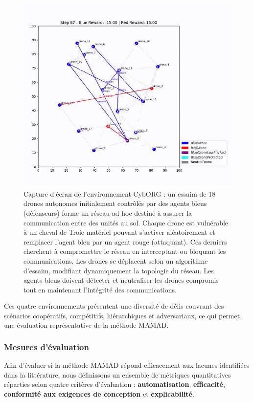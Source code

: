 \begin{figure}[h!]
    \centering
    \includegraphics[width=0.6\linewidth]{figures/cyborg.png}
    \caption{Capture d'écran de l'environnement CybORG : un essaim de 18 drones autonomes initialement contrôlés par des agents bleus (défenseurs) forme un réseau ad hoc destiné à assurer la communication entre des unités au sol. Chaque drone est vulnérable à un cheval de Troie matériel pouvant s'activer aléatoirement et remplacer l'agent bleu par un agent rouge (attaquant). Ces derniers cherchent à compromettre le réseau en interceptant ou bloquant les communications. Les drones se déplacent selon un algorithme d'essaim, modifiant dynamiquement la topologie du réseau. Les agents bleus doivent détecter et neutraliser les drones compromis tout en maintenant l'intégrité des communications.}
    \label{fig:cyborg}
\end{figure}

\bigskip

\noindent Ces quatre environnements présentent une diversité de défis couvrant des scénarios coopératifs, compétitifs, hiérarchiques et adversariaux, ce qui permet une évaluation représentative de la méthode MAMAD.


\subsubsection{Mesures d'évaluation}

Afin d'évaluer si la méthode MAMAD répond efficacement aux lacunes identifiées dans la littérature, nous définissons un ensemble de métriques quantitatives réparties selon quatre critères d'évaluation : \textbf{automatisation}, \textbf{efficacité}, \textbf{conformité aux exigences de conception} et \textbf{explicabilité}.

